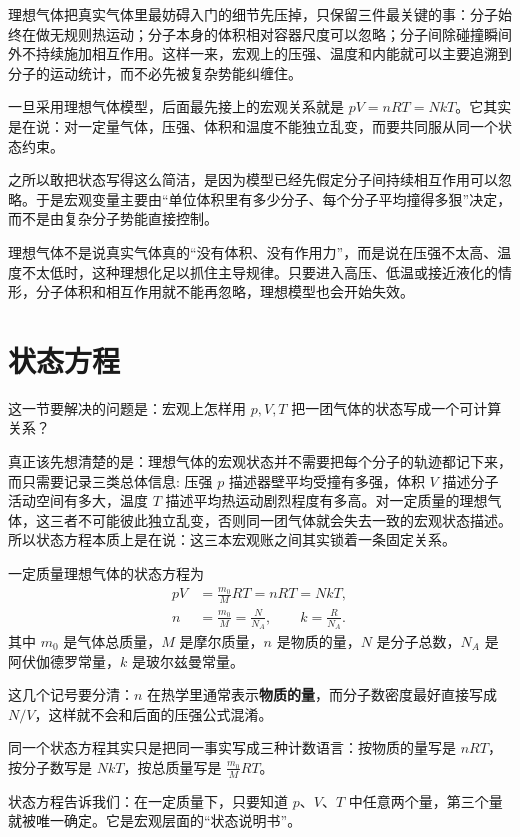 \documentclass[lang=cn,11pt]{elegantbook}
\newcommand{\bridge}[1]{\begin{note}#1\end{note}}
\begin{document}
 理想气体把真实气体里最妨碍入门的细节先压掉，只保留三件最关键的事：分子始终在做无规则热运动；分子本身的体积相对容器尺度可以忽略；分子间除碰撞瞬间外不持续施加相互作用。这样一来，宏观上的压强、温度和内能就可以主要追溯到分子的运动统计，而不必先被复杂势能纠缠住。

 一旦采用理想气体模型，后面最先接上的宏观关系就是 \(pV=nRT=NkT\)。它其实是在说：对一定量气体，压强、体积和温度不能独立乱变，而要共同服从同一个状态约束。

 之所以敢把状态写得这么简洁，是因为模型已经先假定分子间持续相互作用可以忽略。于是宏观变量主要由“单位体积里有多少分子、每个分子平均撞得多狠”决定，而不是由复杂分子势能直接控制。

 理想气体不是说真实气体真的“没有体积、没有作用力”，而是说在压强不太高、温度不太低时，这种理想化足以抓住主导规律。只要进入高压、低温或接近液化的情形，分子体积和相互作用就不能再忽略，理想模型也会开始失效。

\section{状态方程}

这一节要解决的问题是：宏观上怎样用 \(p,V,T\) 把一团气体的状态写成一个可计算关系？

真正该先想清楚的是：理想气体的宏观状态并不需要把每个分子的轨迹都记下来，而只需要记录三类总体信息: 压强 \(p\) 描述器壁平均受撞有多强，体积 \(V\) 描述分子活动空间有多大，温度 \(T\) 描述平均热运动剧烈程度有多高。对一定质量的理想气体，这三者不可能彼此独立乱变，否则同一团气体就会失去一致的宏观状态描述。所以状态方程本质上是在说：这三本宏观账之间其实锁着一条固定关系。

一定质量理想气体的状态方程为
\[
\begin{aligned}
pV&=\frac{m_0}{M}RT=nRT=NkT,\\
n&=\frac{m_0}{M}=\frac{N}{N_A},\qquad k=\frac{R}{N_A}.
\end{aligned}
\]
其中 \(m_0\) 是气体总质量，\(M\) 是摩尔质量，\(n\) 是物质的量，\(N\) 是分子总数，\(N_A\) 是阿伏伽德罗常量，\(k\) 是玻尔兹曼常量。

\bridge{这几个记号要分清：\(n\) 在热学里通常表示\textbf{物质的量}，而分子数密度最好直接写成 \(N/V\)，这样就不会和后面的压强公式混淆。}

\bridge{同一个状态方程其实只是把同一事实写成三种计数语言：按物质的量写是 \(nRT\)，按分子数写是 \(NkT\)，按总质量写是 \(\frac{m_0}{M}RT\)。}

状态方程告诉我们：在一定质量下，只要知道 \(p\)、\(V\)、\(T\) 中任意两个量，第三个量就被唯一确定。它是宏观层面的“状态说明书”。
\end{document}
